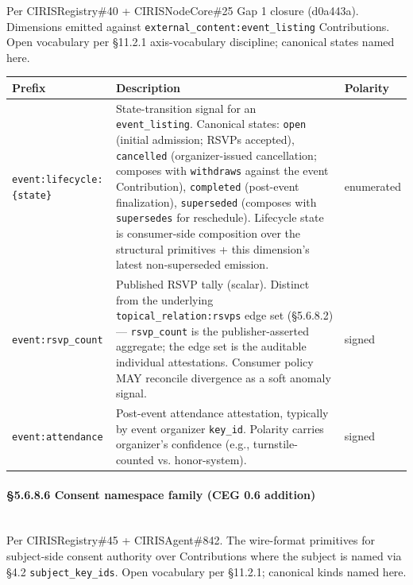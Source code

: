 \documentclass[11pt]{article}
\begin{document}
Per CIRISRegistry\#40 + CIRISNodeCore\#25 Gap 1 closure (d0a443a). Dimensions emitted against \texttt{external\_content:event\_listing} Contributions. Open vocabulary per §11.2.1 axis-vocabulary discipline; canonical states named here.


{\footnotesize
\begin{longtable}{|p{5.33cm}|p{5.33cm}|p{5.33cm}|}\hline
\textbf{Prefix} & \textbf{Description} & \textbf{Polarity} \\ \hline\endhead
\texttt{event:lifecycle:\{state\}} & State-transition signal for an \texttt{event\_listing}. Canonical states: \texttt{open} (initial admission; RSVPs accepted), \texttt{cancelled} (organizer-issued cancellation; composes with \texttt{withdraws} against the event Contribution), \texttt{completed} (post-event finalization), \texttt{superseded} (composes with \texttt{supersedes} for reschedule). Lifecycle state is consumer-side composition over the structural primitives + this dimension's latest non-superseded emission. & enumerated \\ \hline
\texttt{event:rsvp\_count} & Published RSVP tally (scalar). Distinct from the underlying \texttt{topical\_relation:rsvps} edge set (§5.6.8.2) — \texttt{rsvp\_count} is the publisher-asserted aggregate; the edge set is the auditable individual attestations. Consumer policy MAY reconcile divergence as a soft anomaly signal. & signed \\ \hline
\texttt{event:attendance} & Post-event attendance attestation, typically by event organizer \texttt{key\_id}. Polarity carries organizer's confidence (e.g., turnstile-counted vs. honor-system). & signed \\ \hline
\end{longtable}}



\paragraph{§5.6.8.6 Consent namespace family (CEG 0.6 addition)}\mbox{}\\


Per CIRISRegistry\#45 + CIRISAgent\#842. The wire-format primitives for subject-side consent authority over Contributions where the subject is named via §4.2 \texttt{subject\_key\_ids}. Open vocabulary per §11.2.1; canonical kinds named here.
\end{document}
